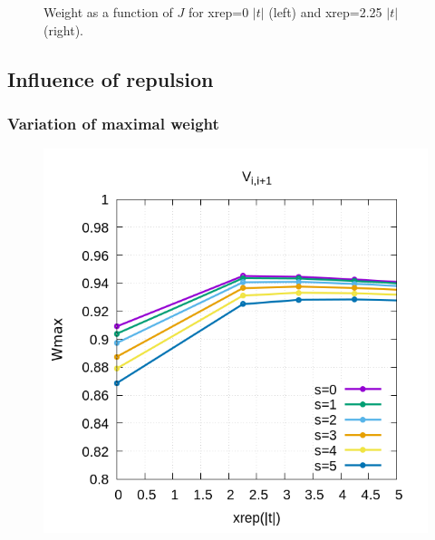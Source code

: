 \documentclass[ openright,titlepage,numbers=noenddot,headinclude,twoside,%
                footinclude=true,cleardoublepage=empty,abstractoff,%
                BCOR=5mm,paper=a4,fontsize=11pt,%
                ngerman,american,%
]{scrreprt}
\begin{document}
\begin{figure}[h!]
\begin{minipage}{0.4\textwidth}
    \end{minipage}
    \caption{\label{fig:} Weight as a function of $J$ for xrep=0 $|t|$ (left) and xrep=2.25 $|t|$ (right). }
\end{figure}



\subsection{Influence of repulsion}
\subsubsection{Variation of maximal weight}
\begin{figure}[h!]
\centering
    \hspace{-2cm}
    \begin{minipage}{0.4\textwidth}
    \includegraphics[scale=0.4]{Wmax_vs_xrep0v1.png}
    \end{minipage}
    \hspace{2cm}
    \begin{minipage}{0.4\textwidth}

\end{minipage}
\end{figure}
\end{document}
